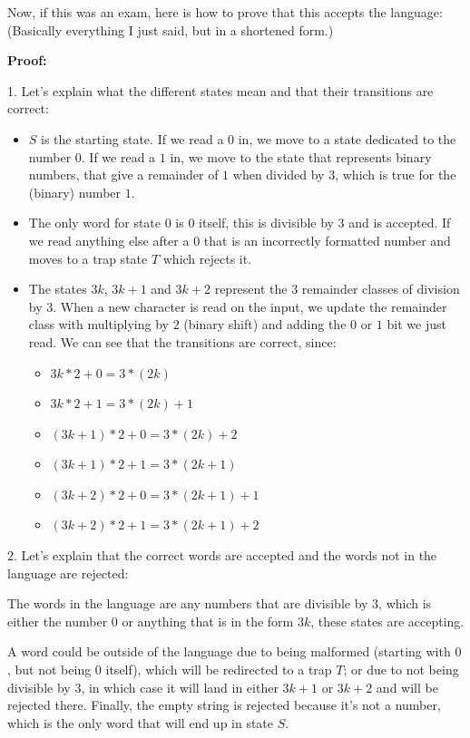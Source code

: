 Now, if this was an exam, here is how to prove that this accepts the language: (Basically everything I just said, but in a shortened form.)

\textbf{Proof:}

1. Let's explain what the different states mean and that their transitions are correct:

\begin{itemize}
    \item $S$ is the starting state. If we read a $0$ in, we move to a state dedicated to the number $0$. If we read a $1$ in, we move to the state that represents binary numbers, that give a remainder of $1$ when divided by $3$, which is true for the (binary) number $1$.
    \item The only word for state $0$ is $0$ itself, this is divisible by $3$ and is accepted. If we read anything else after a $0$ that is an incorrectly formatted number and moves to a trap state $T$ which rejects it.
    \item The states $3k$, $3k+1$ and $3k+2$ represent the 3 remainder classes of division by $3$. When a new character is read on the input, we update the remainder class with multiplying by $2$ (binary shift) and adding the $0$ or $1$ bit we just read. We can see that the transitions are correct, since:
    \begin{itemize}
        \item $3k*2+0 = 3*(2k)$
        \item $3k*2+1 = 3*(2k)+1$
        \item $(3k+1)*2+0 = 3*(2k)+2$
        \item $(3k+1)*2+1 = 3*(2k+1)$
        \item $(3k+2)*2+0 = 3*(2k+1)+1$
        \item $(3k+2)*2+1 = 3*(2k+1)+2$
    \end{itemize}
\end{itemize}

2. Let's explain that the correct words are accepted and the words not in the language are rejected:

The words in the language are any numbers that are divisible by $3$, which is either the number $0$ or anything that is in the form $3k$, these states are accepting.

A word could be outside of the language due to being malformed (starting with $0$, but not being $0$ itself), which will be redirected to a trap $T$; or due to not being divisible by $3$, in which case it will land in either $3k+1$ or $3k+2$ and will be rejected there. Finally, the empty string is rejected because it's not a number, which is the only word that will end up in state $S$.

